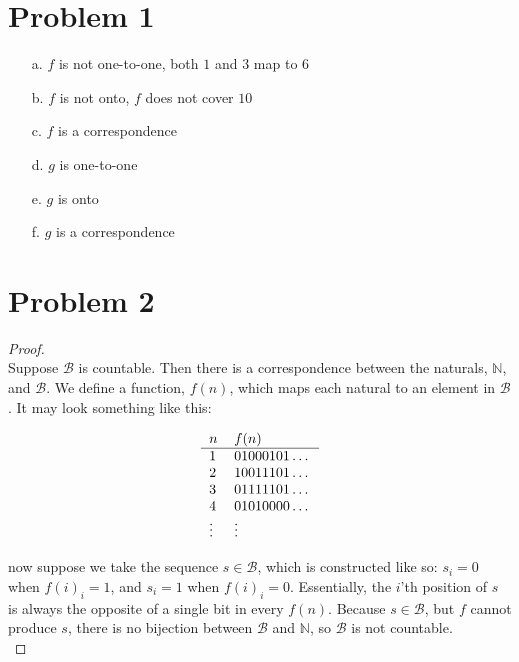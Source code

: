 \documentclass{article}
\newenvironment{problem}[1]{
  \nobreak\section*{Problem #1}
}{}
\begin{document}
  \begin{problem}{1}
    \begin{enumerate}
      \item[a.] $f$ is not one-to-one, both $1$ and $3$ map to $6$
      \item[b.] $f$ is not onto, $f$ does not cover $10$
      \item[c.] $f$ is a  correspondence 
      \item[d.] $g$ is one-to-one
      \item[e.] $g$ is onto
      \item[f.] $g$ is a  correspondence    
    \end{enumerate}
  \end{problem}

  \begin{problem}{2}
    \begin{proof}
      $ $\\
      Suppose $\mathcal{B}$ is countable.  Then there is a
      correspondence between the naturals, $\mathbb{N}$, and
      $\mathcal{B}$.  We define a function, $f(n)$, which maps each
      natural to an element in $\mathcal{B}$.  It may look something
      like this:
      
      \begin{center}
        \begin{displaymath}
          \begin{tabular}{ll}
            $n$ & $f(n)$ \\ \hline
            $1$ & $01000101\dots$ \\
            $2$ & $10011101\dots$ \\
            $3$ & $01111101\dots$ \\
            $4$ & $01010000\dots$ \\
            $\vdots$ & $\vdots$
          \end{tabular}
        \end{displaymath}
      \end{center}

      \noindent
      now suppose we take the sequence $s \in \mathcal{B}$, which is
      constructed like so: $s_i = 0$ when $f(i)_i = 1$, and $s_i = 1$
      when $f(i)_i = 0$.  Essentially, the $i$'th position of $s$ is
      always the opposite of a single bit in every $f(n)$.  Because
      $s \in \mathcal{B}$, but $f$ cannot produce $s$, there is no
      bijection between $\mathcal{B}$ and $\mathbb{N}$, so
      $\mathcal{B}$ is not countable.
      $ $\\
    \end{proof}
  \end{problem}
\end{document}

